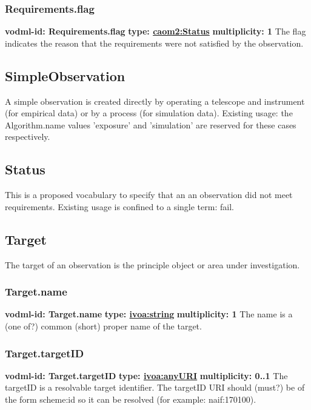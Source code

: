     \subsubsection{Requirements.flag}
      \textbf{vodml-id: Requirements.flag} \newline
      \textbf{type: \hyperref[sect:Status]{caom2:Status}} \newline
      \textbf{multiplicity: 1} \newline
      The flag indicates the reason that the requirements were not satisfied by the observation.

  \subsection{SimpleObservation}
  \label{sect:SimpleObservation}
    A simple observation is created directly by operating a telescope and instrument (for empirical data) or by a process (for simulation data). Existing usage: the Algorithm.name values 'exposure' and 'simulation' are reserved for these cases respectively.

  \subsection{Status}
  \label{sect:Status}
    This is a proposed vocabulary to specify that an an observation did not meet requirements. Existing usage is confined to a single term: fail.

  \subsection{Target}
  \label{sect:Target}
    The target of an observation is the principle object or area under investigation.

    \subsubsection{Target.name}
      \textbf{vodml-id: Target.name} \newline
      \textbf{type: \hyperref[sect:ivoa]{ivoa:string}} \newline
      \textbf{multiplicity: 1} \newline
      The name is a (one of?) common (short) proper name of the target.

    \subsubsection{Target.targetID}
      \textbf{vodml-id: Target.targetID} \newline
      \textbf{type: \hyperref[sect:ivoa]{ivoa:anyURI}} \newline
      \textbf{multiplicity: 0..1} \newline
      The targetID is a resolvable target identifier. The targetID URI should (must?) be of the form {scheme}:{id} so it can be resolved (for example: naif:170100).

